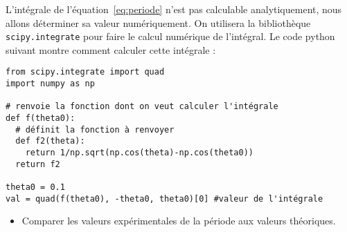 \documentclass{tp}
\begin{document}
L'intégrale de l'équation~\eqref{eq:periode} n'est pas calculable analytiquement, nous allons déterminer sa valeur numériquement. On utilisera la bibliothèque \texttt{scipy.integrate} pour faire le calcul numérique de l'intégral. Le code python suivant montre comment calculer cette intégrale :

\begin{verbatim}
from scipy.integrate import quad
import numpy as np

# renvoie la fonction dont on veut calculer l'intégrale
def f(theta0):
  # définit la fonction à renvoyer
  def f2(theta):
    return 1/np.sqrt(np.cos(theta)-np.cos(theta0))
  return f2

theta0 = 0.1
val = quad(f(theta0), -theta0, theta0)[0] #valeur de l'intégrale
\end{verbatim}

\begin{itemize}
  \item Comparer les valeurs expérimentales de la période aux valeurs théoriques.
\end{itemize}
\end{document}
